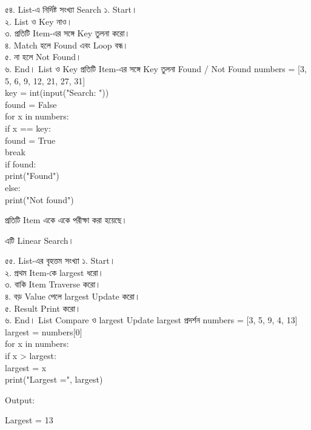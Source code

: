 \exerciseTable
{৫৪. List-এ নির্দিষ্ট সংখ্যা Search}
{
১. Start।\\
২. List ও Key নাও।\\
৩. প্রতিটি Item-এর সঙ্গে Key তুলনা করো।\\
৪. Match হলে Found এবং Loop বন্ধ।\\
৫. না হলে Not Found।\\
৬. End।
}
{
\linearflow
{List ও Key}
{প্রতিটি Item-এর সঙ্গে Key তুলনা}
{Found / Not Found}
}
{
numbers = [3, 5, 6, 9, 12, 21, 27, 31]\\
key = int(input("Search: "))\\
found = False\\
for x in numbers:\\
\hspace*{4mm}if x == key:\\
\hspace*{8mm}found = True\\
\hspace*{8mm}break\\
if found:\\
\hspace*{4mm}print("Found")\\
else:\\
\hspace*{4mm}print("Not found")
}
{
প্রতিটি Item একে একে পরীক্ষা করা হয়েছে।

\medskip

এটি Linear Search।
}


\exerciseTable
{৫৫. List-এর বৃহত্তম সংখ্যা}
{
১. Start।\\
২. প্রথম Item-কে largest ধরো।\\
৩. বাকি Item Traverse করো।\\
৪. বড় Value পেলে largest Update করো।\\
৫. Result Print করো।\\
৬. End।
}
{
\linearflow
{List}
{Compare ও largest Update}
{largest প্রদর্শন}
}
{
numbers = [3, 5, 9, 4, 13]\\
largest = numbers[0]\\
for x in numbers:\\
\hspace*{4mm}if x > largest:\\
\hspace*{8mm}largest = x\\
print("Largest =", largest)
}
{
Output:

\textenglish{\ttfamily Largest = 13}
}

